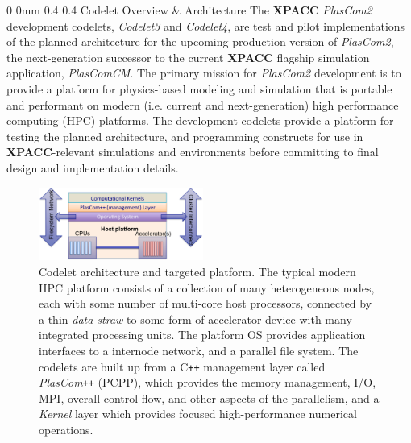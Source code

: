 \documentclass[11pt]{article}
\makeatletter
\renewcommand{\section}{\@startsection
{section}%
{0}%
{0mm}%
{0.4\baselineskip}%
{0.4\baselineskip}%
{\normalfont\Large\bfseries\color{myBrown}}}%
\newcommand{\plusplus}[1]{#1{}\texttt{++}}
\makeatother
\begin{document}
\section{Codelet Overview \& Architecture}
The \textbf{XPACC} \textit{PlasCom2} development codelets, \textit{Codelet3} and \textit{Codelet4}, are test and pilot implementations of the planned architecture for the upcoming production version of \textit{PlasCom2}, the next-generation successor to the current \textbf{XPACC} flagship simulation application, \textit{PlasComCM}.  The primary mission for \textit{PlasCom2} development is to provide a platform for physics-based modeling and simulation that is portable and performant on modern (i.e. current and next-generation) high performance computing (HPC) platforms.  The development codelets provide a platform for testing the planned architecture, and programming constructs for use in \textbf{XPACC}-relevant simulations and environments before committing to final design and implementation details.
\begin{figure}
\vspace{-20pt}
\begin{center}
\includegraphics[width=0.48\textwidth]{Figures/HighArch}
\end{center}
\vspace{-20pt}
\caption{Codelet architecture and targeted platform. The typical modern HPC platform consists of a collection of many heterogeneous nodes, each with some number of multi-core host processors, connected by a thin \textit{data straw} to some form of accelerator device with many integrated processing units. The platform OS provides application interfaces to a internode network, and a parallel file system. The codelets are built up from a \plusplus{C} management layer called \plusplus{\textit{PlasCom}} (PCPP), which provides the memory management, I/O, MPI, overall control flow, and other aspects of the parallelism, and a \textit{Kernel} layer which provides focused high-performance numerical operations.}\label{figure:higharch}
\vspace{-10pt}
\end{figure}
\end{document}

